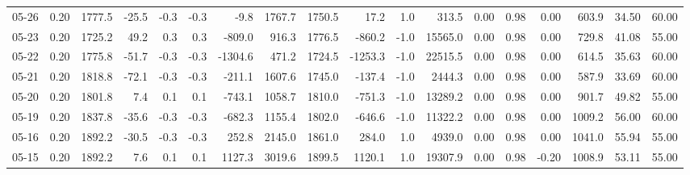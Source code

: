 \begin{threeparttable}
{\begin{tabular}{lrrrrrrrrrrrrrrrrr}
  05-26 &     0.20 & 1777.5 &             -25.5 &              -0.3 &               -0.3 &               -9.8 & 1767.7 & 1750.5 &       17.2 &                      1.0 &               313.5 &       0.00 &      0.98 &           0.00 &            603.9 &           34.50 &                  60.00 \\
  05-23 &     0.20 & 1725.2 &              49.2 &               0.3 &                0.3 &             -809.0 &  916.3 & 1776.5 &     -860.2 &                     -1.0 &             15565.0 &       0.00 &      0.98 &           0.00 &            729.8 &           41.08 &                  55.00 \\
  05-22 &     0.20 & 1775.8 &             -51.7 &              -0.3 &               -0.3 &            -1304.6 &  471.2 & 1724.5 &    -1253.3 &                     -1.0 &             22515.5 &       0.00 &      0.98 &           0.00 &            614.5 &           35.63 &                  60.00 \\
  05-21 &     0.20 & 1818.8 &             -72.1 &              -0.3 &               -0.3 &             -211.1 & 1607.6 & 1745.0 &     -137.4 &                     -1.0 &              2444.3 &       0.00 &      0.98 &           0.00 &            587.9 &           33.69 &                  60.00 \\
  05-20 &     0.20 & 1801.8 &               7.4 &               0.1 &                0.1 &             -743.1 & 1058.7 & 1810.0 &     -751.3 &                     -1.0 &             13289.2 &       0.00 &      0.98 &           0.00 &            901.7 &           49.82 &                  55.00 \\
  05-19 &     0.20 & 1837.8 &             -35.6 &              -0.3 &               -0.3 &             -682.3 & 1155.4 & 1802.0 &     -646.6 &                     -1.0 &             11322.2 &       0.00 &      0.98 &           0.00 &           1009.2 &           56.00 &                  60.00 \\
  05-16 &     0.20 & 1892.2 &             -30.5 &              -0.3 &               -0.3 &              252.8 & 2145.0 & 1861.0 &      284.0 &                      1.0 &              4939.0 &       0.00 &      0.98 &           0.00 &           1041.0 &           55.94 &                  55.00 \\
  05-15 &     0.20 & 1892.2 &               7.6 &               0.1 &                0.1 &             1127.3 & 3019.6 & 1899.5 &     1120.1 &                      1.0 &             19307.9 &       0.00 &      0.98 &          -0.20 &           1008.9 &           53.11 &                  55.00 \\

\end{tabular}}
\end{threeparttable}
